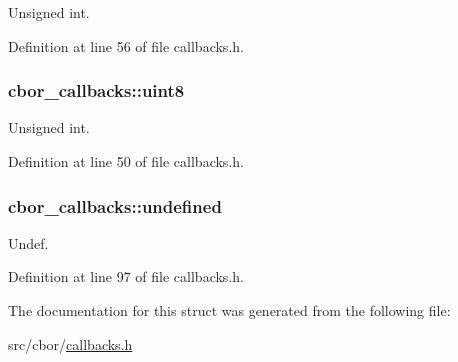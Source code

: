 Unsigned int. 



Definition at line 56 of file callbacks.\-h.

\hypertarget{structcbor__callbacks_af2d69429c9bc71edf55b6f4f1dbb76d1}{
\subsubsection[{uint8}]{ cbor\-\_\-callbacks\-::uint8}}\label{structcbor__callbacks_af2d69429c9bc71edf55b6f4f1dbb76d1}


Unsigned int. 



Definition at line 50 of file callbacks.\-h.

\hypertarget{structcbor__callbacks_af9b30de5bef7bf76e8e34bdd95434f98}{
\subsubsection[{undefined}]{ cbor\-\_\-callbacks\-::undefined}}\label{structcbor__callbacks_af9b30de5bef7bf76e8e34bdd95434f98}


Undef. 



Definition at line 97 of file callbacks.\-h.



The documentation for this struct was generated from the following file\-:\begin{DoxyCompactItemize}
\item 
src/cbor/\hyperlink{callbacks_8h}{callbacks.\-h}\end{DoxyCompactItemize}

